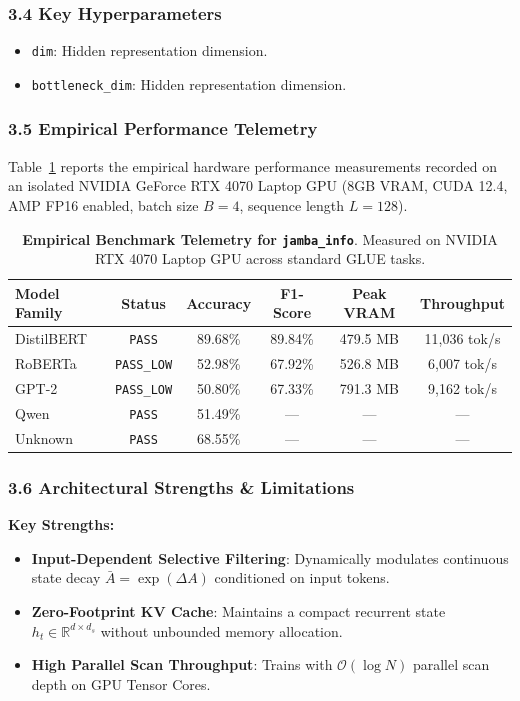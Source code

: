 \subsubsection*{3.4 Key Hyperparameters}
\begin{itemize}
    \item \texttt{dim}: Hidden representation dimension.
    \item \texttt{bottleneck\_dim}: Hidden representation dimension.
\end{itemize}

\subsubsection*{3.5 Empirical Performance Telemetry}
Table~\ref{tab:telemetry_jamba_info} reports the empirical hardware performance measurements recorded on an isolated NVIDIA GeForce RTX 4070 Laptop GPU (8GB VRAM, CUDA 12.4, AMP FP16 enabled, batch size $B=4$, sequence length $L=128$).

\begin{table}[h]
\centering
\small
\caption{\textbf{Empirical Benchmark Telemetry for \texttt{jamba\_info}}. Measured on NVIDIA RTX 4070 Laptop GPU across standard GLUE tasks.}
\label{tab:telemetry_jamba_info}
\begin{tabular*}{\columnwidth}{@{\extracolsep{\fill}}lccccc}
\toprule
\textbf{Model Family} & \textbf{Status} & \textbf{Accuracy} & \textbf{F1-Score} & \textbf{Peak VRAM} & \textbf{Throughput} \\
\midrule
DistilBERT & \texttt{PASS} & 89.68\% & 89.84\% & 479.5 MB & 11,036 tok/s \\
RoBERTa & \texttt{PASS\_LOW} & 52.98\% & 67.92\% & 526.8 MB & 6,007 tok/s \\
GPT-2 & \texttt{PASS\_LOW} & 50.80\% & 67.33\% & 791.3 MB & 9,162 tok/s \\
Qwen & \texttt{PASS} & 51.49\% & --- & --- & --- \\
Unknown & \texttt{PASS} & 68.55\% & --- & --- & --- \\
\bottomrule
\end{tabular*}
\end{table}

\subsubsection*{3.6 Architectural Strengths \& Limitations}
\textbf{Key Strengths:}
\begin{itemize}
    \item \textbf{Input-Dependent Selective Filtering}: Dynamically modulates continuous state decay $\bar{A} = \exp(\Delta A)$ conditioned on input tokens.
    \item \textbf{Zero-Footprint KV Cache}: Maintains a compact recurrent state $h_t \in \mathbb{R}^{d \times d_s}$ without unbounded memory allocation.
    \item \textbf{High Parallel Scan Throughput}: Trains with $\mathcal{O}(\log N)$ parallel scan depth on GPU Tensor Cores.
\end{itemize}

